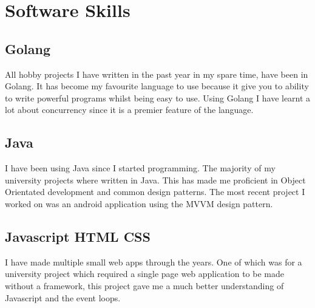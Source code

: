 \documentclass[a4paper]{cv}
\begin{document}
\begin{minipage}[t]{0.26\textwidth}

\section{Software Skills}
\subsection{Golang}
\begin{flushleft}
All hobby projects I have written in the past year in my spare time, have been in Golang. It has become my favourite language to use because it give you to ability to write powerful programs whilst being easy to use. Using Golang I have learnt a lot about concurrency since it is a premier feature of the language.
\end{flushleft}
\sectionspace

\subsection{Java}
\begin{flushleft}
I have been using Java since I started programming. The majority of my university projects where written in Java. This has made me proficient in Object Orientated development and common design patterns. The most recent project I worked on was an android application using the MVVM design pattern.
\end{flushleft}

\sectionspace
\subsection{Javascript \textbullet{} HTML \textbullet{} CSS}
\begin{flushleft}
I have made multiple small web apps through the years. One of which was for a university project which required a single page web application to be made without a framework, this project gave me a much better understanding of Javascript and the event loops.
\end{flushleft}

\end{minipage}
\end{document}

